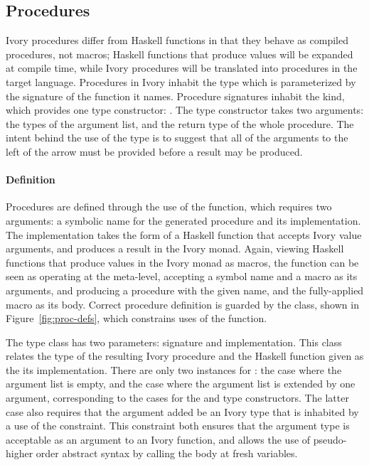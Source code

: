 \subsection{Procedures}
\label{sec:proc}

Ivory procedures differ from Haskell functions in that they behave as compiled
procedures, not macros; Haskell functions that produce  values will be
expanded at compile time, while Ivory procedures will be translated into
procedures in the target language.  Procedures in Ivory inhabit the 
type which is parameterized by the signature of the function it names.
Procedure signatures inhabit the  kind, which provides one type
constructor: \cd{:->}.  The \cd{:->} type constructor takes two arguments: the
types of the argument list, and the return type of the whole procedure.  The
intent behind the use of the \cd{:->} type is to suggest that all of the
arguments to the left of the arrow must be provided before a result may be
produced.

\paragraph{Definition}

Procedures are defined through the use of the  function, which requires
two arguments: a symbolic name for the generated procedure and its
implementation.  The implementation takes the form of a Haskell function that
accepts Ivory value arguments, and produces a result in the Ivory monad.  Again,
viewing Haskell functions that produce values in the Ivory monad as macros, the
 function can be seen as operating at the meta-level, accepting a
symbol name and a macro as its arguments, and producing a procedure with the given
name, and the fully-applied macro as its body.  Correct procedure definition is
guarded by the  class, shown in Figure~\ref{fig:proc-defs},
which constrains uses of the  function.

The  type class has two parameters: signature and implementation.
This class relates the  type of the resulting Ivory procedure and
the Haskell function given as the its implementation.  There are only
two instances for : the case where the argument list
is empty, and the case where the argument list is extended by one
argument, corresponding to the cases for the  and 
type constructors.  The latter case also requires that the argument
added be an Ivory type that is inhabited by a use of the 
constraint.  This constraint both ensures that the argument type is
acceptable as an argument to an Ivory function, and allows the use of
pseudo-higher order abstract syntax by calling the body at fresh variables.

